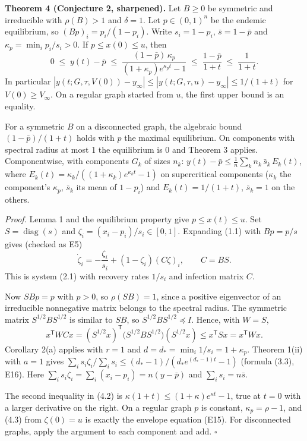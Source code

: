 \documentclass[
  11pt,
  a4paper,
]{article}
\begin{document}
\textbf{Theorem 4 (Conjecture 2, sharpened).} Let \(B\ge0\) be symmetric
and irreducible with \(\rho(B)>1\) and \(\delta=1\). Let \(p\in(0,1)^n\)
be the endemic equilibrium, so \((Bp)_i=p_i/(1-p_i)\). Write
\(s_i=1-p_i\), \(\bar s=1-\bar p\) and \(\kappa_p=\min_ip_i/s_i>0\). If
\(p\le x(0)\le u\), then \[
0\;\le\;y(t)-\bar p\;\le\;\frac{(1-\bar p)\,\kappa_p}{(1+\kappa_p)e^{\kappa_pt}-1}\;\le\;\frac{1-\bar p}{1+t}\;\le\;\frac1{1+t}. \tag{4.2}
\] In particular
\(|y(t;G,\tau,V(0))-y_\infty|\le|y(t;G,\tau,u)-y_\infty|\le1/(1+t)\) for
\(V(0)\ge V_\infty\). On a regular graph started from \(u\), the first
upper bound is an equality.

For a symmetric \(B\) on a disconnected graph, the algebraic bound
\((1-\bar p)/(1+t)\) holds with \(p\) the maximal equilibrium. On
components with spectral radius at most 1 the equilibrium is \(0\) and
Theorem 3 applies. Componentwise, with components \(G_k\) of sizes
\(n_k\): \(y(t)-\bar p\le\frac1n\sum_kn_k\,\bar s_k\,E_k(t)\), where
\(E_k(t)=\kappa_k/((1+\kappa_k)e^{\kappa_kt}-1)\) on supercritical
components (\(\kappa_k\) the component's \(\kappa_p\), \(\bar s_k\) its
mean of \(1-p_i\)) and \(E_k(t)=1/(1+t)\), \(\bar s_k=1\) on the others.

\emph{Proof.} Lemma 1 and the equilibrium property give
\(p\le x(t)\le u\). Set \(S=\operatorname{diag}(s)\) and
\(\zeta_i=(x_i-p_i)/s_i\in[0,1]\). Expanding (1.1) with \(Bp=p/s\) gives
(checked as E5)
\[\dot\zeta_i=-\frac{\zeta_i}{s_i}+(1-\zeta_i)(C\zeta)_i,\qquad C=BS. \tag{4.3}\]
This is system (2.1) with recovery rates \(1/s_i\) and infection matrix
\(C\).

Now \(SBp=p\) with \(p>0\), so \(\rho(SB)=1\), since a positive
eigenvector of an irreducible nonnegative matrix belongs to the spectral
radius. The symmetric matrix \(S^{1/2}BS^{1/2}\) is similar to \(SB\),
so \(S^{1/2}BS^{1/2}\preceq I\). Hence, with \(W=S\),
\[x^{\mathsf T}WCx=(S^{1/2}x)^{\mathsf T}\big(S^{1/2}BS^{1/2}\big)(S^{1/2}x)\le x^{\mathsf T}Sx=x^{\mathsf T}Wx .\]
Corollary 2(a) applies with \(r=1\) and
\(d=d_*=\min_i1/s_i=1+\kappa_p\). Theorem 1(ii) with \(a=1\) gives
\(\sum_is_i\zeta_i/\sum_is_i\le(d_*-1)/(d_*e^{(d_*-1)t}-1)\) (formula
(3.3), E16). Here \(\sum_is_i\zeta_i=\sum_i(x_i-p_i)=n(y-\bar p)\) and
\(\sum_is_i=n\bar s\).

The second inequality in (4.2) is
\(\kappa(1+t)\le(1+\kappa)e^{\kappa t}-1\), true at \(t=0\) with a
larger derivative on the right. On a regular graph \(p\) is constant,
\(\kappa_p=\rho-1\), and (4.3) from \(\zeta(0)=u\) is exactly the
envelope equation (E15). For disconnected graphs, apply the argument to
each component and add. \(\square\)
\end{document}
